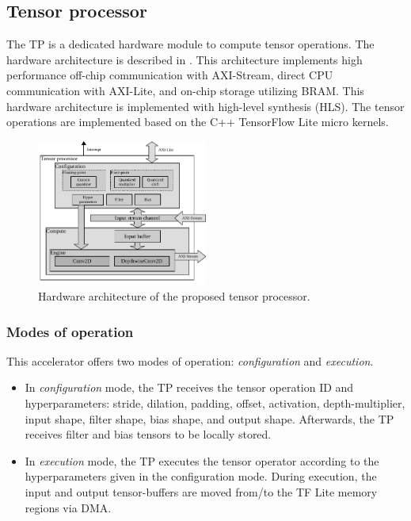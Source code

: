 \subsection{Tensor processor}
The TP is a dedicated hardware module to compute tensor operations. The hardware architecture is described in . This architecture implements high performance off-chip communication with AXI-Stream, direct CPU communication with AXI-Lite, and on-chip storage utilizing BRAM. This hardware architecture is implemented with high-level synthesis (HLS). The tensor operations are implemented based on the C++ TensorFlow Lite micro kernels.
\begin{figure}[t!]
	\centering
	\includegraphics[width=0.5\textwidth]{../figures/accelerator.pdf}
	\caption{Hardware architecture of the proposed tensor processor.}
	\label{fig:accelerator}
\end{figure}
\subsubsection{\textbf{Modes of operation}} This accelerator offers two modes of operation: \emph{configuration} and \emph{execution}.
\begin{itemize}
	\item In \emph{configuration} mode, the TP receives the tensor operation ID and hyperparameters: stride, dilation, padding, offset, activation, depth-multiplier, input shape, filter shape, bias shape, and output shape. Afterwards, the TP receives filter and bias tensors to be locally stored.
	
	\item In \emph{execution} mode, the TP executes the tensor operator according to the hyperparameters given in the configuration mode. During execution, the input and output tensor-buffers are moved from/to the TF Lite memory regions via DMA.
\end{itemize}
